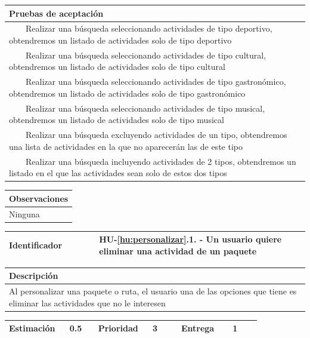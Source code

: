 \documentclass[11pt]{article}
\newcommand{\tabitem}{~~\llap{\textbullet}~~}
\begin{document}
\begin{longtable}{p{1.028\linewidth}}
	\textbf{Pruebas de aceptación}\\
	\midrule
	\tabitem Realizar una búsqueda seleccionando actividades de tipo deportivo, obtendremos un listado de actividades solo de tipo deportivo\\
	\tabitem Realizar una búsqueda seleccionando actividades de tipo cultural, obtendremos un listado de actividades solo de tipo cultural\\
	\tabitem Realizar una búsqueda seleccionando actividades de tipo gastronómico, obtendremos un listado de actividades solo de tipo gastronómico\\
	\tabitem Realizar una búsqueda seleccionando actividades de tipo musical, obtendremos un listado de actividades solo de tipo musical\\
	\tabitem Realizar una búsqueda excluyendo actividades de un tipo, obtendremos una lista de actividades en la que no aparecerán las de este tipo\\
	\tabitem Realizar una búsqueda incluyendo actividades de 2 tipos, obtendremos un listado en el que las actividades sean solo de estos dos tipos\\
\end{longtable}
\begin{longtable}{p{1.028\linewidth}}
	\textbf{Observaciones}\\
	\midrule
	Ninguna\\
	\bottomrule
	\bottomrule
\end{longtable}

\centering
\begin{longtable}{p{0.3\linewidth}|p{0.7\linewidth}}
	\toprule
	\toprule
	\textbf{Identificador} & \textbf{HU-\ref{hu:personalizar}.1}. - Un usuario quiere eliminar una actividad de un paquete\\
	
	\bottomrule
\end{longtable}

\begin{longtable}{p{1.028\linewidth}}
	\textbf{Descripción}\\
	\midrule
	Al personalizar una paquete o ruta, el usuario una de las opciones que tiene es eliminar las actividades que no le interesen
\end{longtable}
\begin{longtable}{p{0.18\linewidth}|p{0.1\linewidth}|p{0.18\linewidth}|p{0.1\linewidth}|p{0.18\linewidth}|p{0.1\linewidth}}
	\toprule
	\textbf{Estimación} & 0.5 & \textbf{Prioridad} & 3 & \textbf{Entrega} & 1 \\
	\bottomrule
\end{longtable}
\end{document}

